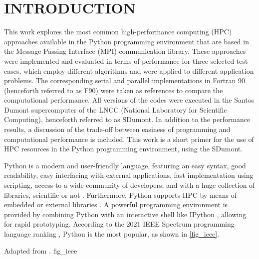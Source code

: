 \chapter{INTRODUCTION}
\label{ch_introduction}

This work explores the most common high-performance computing (HPC) approaches available in the Python programming environment that are based in the Message Passing Interface (MPI) communication library. These approaches were implemented and evaluated in terms of performance for three selected test cases, which employ different algorithms and were applied to different application problems. The corresponding serial and parallel implementations in Fortran 90 (henceforth referred to as F90) were taken as references to compare the computational performance. All versions of the codes were executed in the Santos Dumont supercomputer of the LNCC (National Laboratory for Scientific Computing), henceforth referred to as SDumont. In addition to the performance results, a discussion of the trade-off between easiness of programming and computational performance is included. This work is a short primer for the use of HPC resources in the Python programming environment, using the SDumont.

Python is a modern and user-friendly language, featuring an easy syntax, good readability, easy interfacing with external applications, fast implementation using scripting, access to a wide community of developers, and with a huge collection of libraries, scientific or not \cite {Lunacek2013,Virtanen2020}. Furthermore, Python supports HPC by means of embedded or external libraries \cite {Sehrish2017}. A powerful programming environment is provided by combining Python with an interactive shell like IPython \cite {Perez2007}, allowing for rapid prototyping. According to the 2021 IEEE Spectrum programming language ranking \cite {IEEE2021}, Python is the most popular, as shown in \autoref {fig_ieee}.

     {Adapted from .} {fig_ieee}

